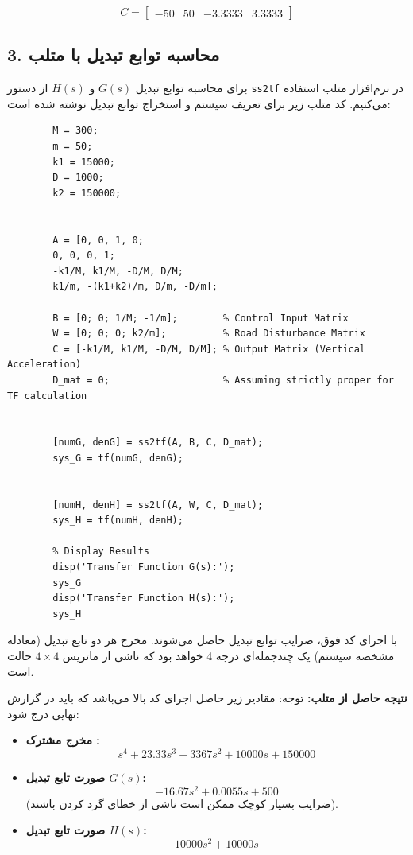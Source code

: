 \documentclass[a4paper]{article}
\begin{document}
	\begin{equation}
		C = \begin{bmatrix} -50 & 50 & -3.3333 & 3.3333 \end{bmatrix}
	\end{equation}
	
	\subsection{3. محاسبه توابع تبدیل با متلب}
	برای محاسبه توابع تبدیل $G(s)$ و $H(s)$ از دستور \texttt{ss2tf} در نرم‌افزار متلب استفاده می‌کنیم. کد متلب زیر برای تعریف سیستم و استخراج توابع تبدیل نوشته شده است:
	
	\begin{lstlisting}[caption={کد متلب برای تعریف سیستم و محاسبه توابع تبدیل}]
		% System Parameters
		M = 300;
		m = 50;
		k1 = 15000;
		D = 1000;
		k2 = 150000;
		

		A = [0, 0, 1, 0;
		0, 0, 0, 1;
		-k1/M, k1/M, -D/M, D/M;
		k1/m, -(k1+k2)/m, D/m, -D/m];
		
		B = [0; 0; 1/M; -1/m];        % Control Input Matrix
		W = [0; 0; 0; k2/m];          % Road Disturbance Matrix
		C = [-k1/M, k1/M, -D/M, D/M]; % Output Matrix (Vertical Acceleration)
		D_mat = 0;                    % Assuming strictly proper for TF calculation
		

		[numG, denG] = ss2tf(A, B, C, D_mat);
		sys_G = tf(numG, denG);
		
	
		[numH, denH] = ss2tf(A, W, C, D_mat);
		sys_H = tf(numH, denH);
		
		% Display Results
		disp('Transfer Function G(s):');
		sys_G
		disp('Transfer Function H(s):');
		sys_H
	\end{lstlisting}
	
	با اجرای کد فوق، ضرایب توابع تبدیل حاصل می‌شوند. مخرج هر دو تابع تبدیل (معادله مشخصه سیستم) یک چندجمله‌ای درجه 4 خواهد بود که ناشی از ماتریس $4 \times 4$ حالت است.
	
	\textbf{نتیجه حاصل از متلب:}
	توجه: مقادیر زیر حاصل اجرای کد بالا می‌باشد که باید در گزارش نهایی درج شود:
	
	\begin{itemize}
		\item \textbf{مخرج مشترک :}
		\[ s^4 + 23.33 s^3 + 3367 s^2 + 10000 s + 150000 \]
		
		\item \textbf{صورت تابع تبدیل $G(s)$:}
		\[ -16.67 s^2 + 0.0055 s + 500 \]
		(ضرایب بسیار کوچک ممکن است ناشی از خطای گرد کردن باشند).
		
		\item \textbf{صورت تابع تبدیل $H(s)$:}
		\[ 10000 s^2 + 10000 s \]
	\end{itemize}
	
\end{document}
